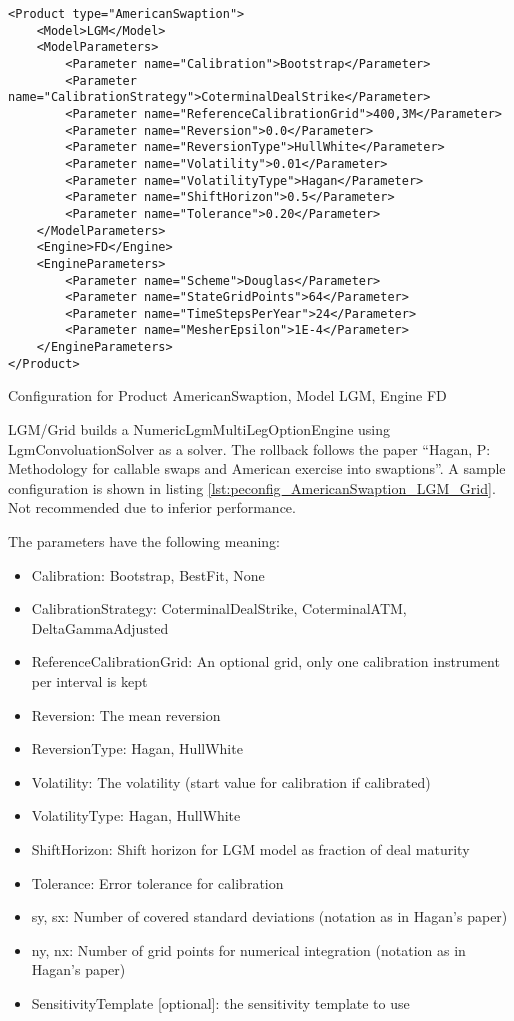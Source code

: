 \begin{longlisting}
\begin{verbatim}
<Product type="AmericanSwaption">
    <Model>LGM</Model>
    <ModelParameters>
        <Parameter name="Calibration">Bootstrap</Parameter>
        <Parameter name="CalibrationStrategy">CoterminalDealStrike</Parameter>
        <Parameter name="ReferenceCalibrationGrid">400,3M</Parameter>
        <Parameter name="Reversion">0.0</Parameter>
        <Parameter name="ReversionType">HullWhite</Parameter>
        <Parameter name="Volatility">0.01</Parameter>
        <Parameter name="VolatilityType">Hagan</Parameter>
        <Parameter name="ShiftHorizon">0.5</Parameter>
        <Parameter name="Tolerance">0.20</Parameter>
    </ModelParameters>
    <Engine>FD</Engine>
    <EngineParameters>
        <Parameter name="Scheme">Douglas</Parameter>
        <Parameter name="StateGridPoints">64</Parameter>
        <Parameter name="TimeStepsPerYear">24</Parameter>
        <Parameter name="MesherEpsilon">1E-4</Parameter>
    </EngineParameters>
</Product>
\end{verbatim}
\caption{Configuration for Product AmericanSwaption, Model LGM, Engine FD}
\label{lst:peconfig_AmericanSwaption_LGM_FD}
\end{longlisting}

LGM/Grid builds a NumericLgmMultiLegOptionEngine using LgmConvoluationSolver as a solver. The rollback follows the paper
``Hagan, P: Methodology for callable swaps and American exercise into swaptions''. A sample configuration is shown in
listing \ref{lst:peconfig_AmericanSwaption_LGM_Grid}. Not recommended due to inferior performance.

The parameters have the following meaning:

\begin{itemize}
\item Calibration: Bootstrap, BestFit, None
\item CalibrationStrategy: CoterminalDealStrike, CoterminalATM, DeltaGammaAdjusted
\item ReferenceCalibrationGrid: An optional grid, only one calibration instrument per interval is kept
\item Reversion: The mean reversion
\item ReversionType: Hagan, HullWhite
\item Volatility: The volatility (start value for calibration if calibrated)
\item VolatilityType: Hagan, HullWhite
\item ShiftHorizon: Shift horizon for LGM model as fraction of deal maturity
\item Tolerance: Error tolerance for calibration
\item sy, sx: Number of covered standard deviations (notation as in Hagan's paper)
\item ny, nx: Number of grid points for numerical integration (notation as in Hagan's paper)
\item SensitivityTemplate [optional]: the sensitivity template to use 
\end{itemize}

